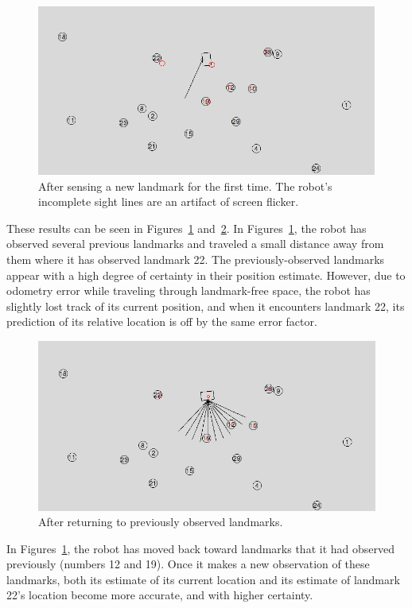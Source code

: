 \documentclass[prodmode,acmtecs]{acmsmall} %
\begin{document}
\begin{figure}[h!]
\includegraphics[width=\textwidth]{update1.png}
\caption{After sensing a new landmark for the first time.  The robot's incomplete sight lines are an artifact of screen flicker.}
\label{fig:update1}
\end{figure}

These results can be seen in Figures~\ref{fig:update1} and~\ref{fig:update2}.  In Figures~\ref{fig:update1}, the robot has observed several previous landmarks and traveled a small distance away from them where it has observed landmark 22.  The previously-observed landmarks appear with a high degree of certainty in their position estimate.  However, due to odometry error while traveling through landmark-free space, the robot has slightly lost track of its current position, and when it encounters landmark 22, its prediction of its relative location is off by the same error factor.

\begin{figure}[h!]
\includegraphics[width=\textwidth]{update2.png}
\caption{After returning to previously observed landmarks.}
\label{fig:update2}
\end{figure}

In Figures~\ref{fig:update1}, the robot has moved back toward landmarks that it had observed previously (numbers 12 and 19).  Once it makes a new observation of these landmarks, both its estimate of its current location and its estimate of landmark 22's location become more accurate, and with higher certainty.
\end{document}
